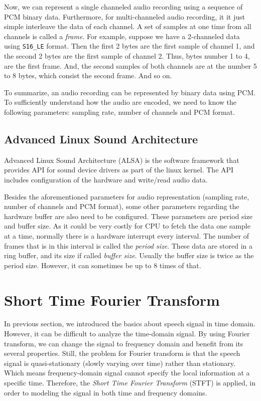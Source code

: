 \documentclass[11pt,a4paper]{report}
\begin{document}
Now, we can represent a single channeled audio recording using a sequence of PCM binary data. Furthermore, for multi-channeled audio recording, it it just simple interleave the data of each channel. A set of samples at one time from all channels is called a \textit{frame}. For example, suppose we have a 2-channeled data using \texttt{S16\_LE} format. Then the first 2 bytes are the first sample of channel 1, and the second 2 bytes are the first sample of channel 2. Thus, bytes number 1 to 4, are the first frame. And, the second samples of both channels are at the number 5 to 8 bytes, which consist the second frame. And so on.

To summarize, an audio recording can be represented by binary data using PCM. To sufficiently understand how the audio are encoded, we need to know the following parameters: sampling rate, number of channels and PCM format.

\subsection{Advanced Linux Sound Architecture}
Advanced Linux Sound Architecture (ALSA) is the software framework that provides API for sound device drivers as part of the linux kernel. The API includes configuration of the hardware and write/read audio data.

Besides the aforementioned parameters for audio representation (sampling rate, number of channels and PCM format), some other parameters regarding the hardware buffer are also need to be configured. These parameters are period size and buffer size. As it could be very costly for CPU to fetch the data one sample at a time, normally there is a hardware interrupt every interval. The number of frames that is in this interval is called the \textit{period size}. These data are stored in a ring buffer, and its size if called \textit{buffer size}. Usually the buffer size is twice as the period size. However, it can sometimes be up to 8 times of that.


\section{Short Time Fourier Transform}
In previous section, we introduced the basics about speech signal in time domain. However, it can be difficult to analyze the time-domain signal. By using Fourier transform, we can change the signal to frequency domain and benefit from its several properties. Still, the problem for Fourier transform is that the speech signal is quasi-stationary (slowly varying over time) rather than stationary. Which means frequency-domain signal cannot specify the local information at a specific time. Therefore, the \textit{Short Time Fourier Transform} (STFT) is applied, in order to modeling the signal in both time and frequency domains.
\end{document}
